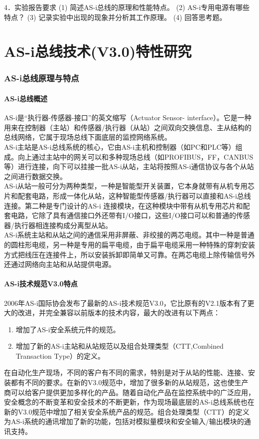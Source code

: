 \tableofcontents
\clearpage

4．实验报告要求
(1) 简述AS-i总线的原理和性能特点。
(2) AS-i专用电源有哪些特点？
(3) 记录实验中出现的现象并分析其工作原理。
(4) 回答思考题。
\part{AS-i总线技术(V3.0)特性研究}
\section{AS-i总线原理与特点}
\subsection{AS-i总线概述}
AS-i是“执行器-传感器-接口”的英文缩写（Actuator Sensor- interface）。它是一种用来在控制器（主站）和传感器/执行器（从站）之间双向交换信息、主从结构的总线网络，它属于现场总线下面底层的监控网络系统。\\
AS-i主站是AS-i总线系统的核心，它由AS-i主机和控制器（如PC和PLC等）组成。向上通过主站中的网关可以和多种现场总线（如PROFIBUS，FF，CANBUS等）进行连接，向下可以挂接一批AS-i从站，主站将按照AS-i通信协议与各个从站之间进行数据交换。\\
AS-i从站一般可分为两种类型，一种是智能型开关装置，它本身就带有从机专用芯片和配套电路，形成一体化从站，这种智能型传感器/执行器可以直接和AS-i总线连接。第二种是专门设计的AS-i 连接模块，在这种模块中带有从机专用芯片和配套电路，它除了具有通信接口外还带有I/O接口，这些I/O接口可以和普通的传感器/执行器相连接构成分离型从站。\\
AS-i系统主站和从站之间的通信采用非屏蔽、非绞接的两芯电缆。其中一种是普通的圆柱形电缆，另一种是专用的扁平电缆，由于扁平电缆采用一种特殊的穿刺安装方式把线压在连接件上，所以安装拆卸即简单又可靠。在两芯电缆上除传输信号外还通过网络向主站和从站提供电源。
\subsection{AS-i技术规范V3.0特点}
2006年AS-i国际协会发布了最新的AS-i技术规范V3.0，它比原有的V2.1版本有了更大的改进，并完全兼容以前版本的技术内容，最大的改进有以下两点：
\begin{enumerate}
\item 增加了AS-i安全系统元件的规范。
\item 增加了新的AS-i主站和从站规范以及组合处理类型（CTT,Combined Transaction Type）的定义。
\end{enumerate}
在自动化生产现场，不同的客户有不同的需求，特别是对于从站的性能、连接、安装都有不同的要求。在新的V3.0规范中，增加了很多新的从站规范，这也使生产商可以给客户提供更加多样化的产品。随着自动化产品在监控系统中的广泛应用，安全概念的不断变革和安全技术的不断更新，作为现场最底层的AS-i总线系统也在新的V3.0规范中增加了相关安全系统产品的规范。组合处理类型（CTT）的定义为AS-i系统的通讯增加了新的功能，包括对模拟量模块和安全输入/输出模块的通讯支持。
